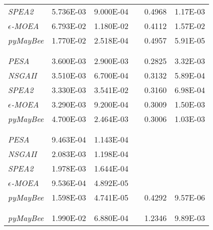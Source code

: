 \begin{table}
\begin{tabular}{L{4cm} c c c c c}
  \textit{SPEA2}           &  \num{5.736E-03} & \num{9.000E-04} & &  \num{0.4968} & \num{1.17E-03} \\
  \textit{$\epsilon$-MOEA} & \num{6.793E-02} & \num{1.180E-02} & & \num{0.4112} & \num{1.57E-02} \\
  \textit{pyMayBee}        & \num{1.770E-02} &  \num{2.518E-04} & & \num{0.4957} &  \num{5.91E-05} \\
  \\
  \addlinespace[\defaultaddspace]
                                                                                \\
  \midrule
  \textit{PESA}            & \num{3.600E-03} & \num{2.900E-03} & & \num{0.2825} & \num{3.32E-03} \\
  \textit{NSGAII}          & \num{3.510E-03} &  \num{6.700E-04} & & \num{0.3132} & \num{5.89E-04} \\
  \textit{SPEA2}           & \num{3.330E-03} & \num{3.541E-02} & &  \num{0.3160} &  \num{6.98E-04} \\
  \textit{$\epsilon$-MOEA} &  \num{3.290E-03} & \num{9.200E-04} & & \num{0.3009} & \num{1.50E-03} \\
  \textit{pyMayBee}        & \num{4.700E-03} & \num{2.464E-03} & & \num{0.3006} & \num{1.03E-03} \\
  \\
  \addlinespace[\defaultaddspace]
                                                                            \\
  \midrule
  \textit{PESA}            & \num{9.463E-04} & \num{1.143E-04} & & &                \\
  \textit{NSGAII}          & \num{2.083E-03} & \num{1.198E-04} & & &                \\
  \textit{SPEA2}           & \num{1.978E-03} & \num{1.644E-04} & & &                \\
  \textit{$\epsilon$-MOEA} &  \num{9.536E-04} & \num{4.892E-05} & & &                \\
  \textit{pyMayBee}        & \num{1.598E-03} &  \num{4.741E-05} & & \num{0.4292} & \num{9.57E-06}  \\
  \\
  \addlinespace[\defaultaddspace]
                                                                         \\
  \midrule
  \textit{pyMayBee}        & \num{1.990E-02} & \num{6.880E-04} & & \num{1.2346} & \num{9.89E-03} \\
  \bottomrule
  \end{tabular}
\end{table}

